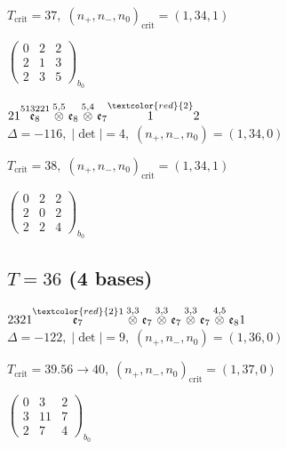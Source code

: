 \documentclass[10pt]{article}
\begin{document}
\hspace{1em}$T_{\text{crit}}=37,\; (n_+,n_-,n_0)_{\text{crit}}=(1,34,1)$

\hspace{2em}$\left(\begin{smallmatrix}0 & 2 & 2 \\ 2 & 1 & 3 \\ 2 & 3 & 5\end{smallmatrix}\right)_{\!b_0}$

\smallskip

$21\overset{513221}{\mathfrak{e}_8}\overset{5,5}{\otimes}\mathfrak{e}_8\overset{5,4}{\otimes}\mathfrak{e}_7\overset{\textcolor{red}{2}}{1}2$ \quad $\Delta=-116,\; |\det|=4,\; (n_+,n_-,n_0)=(1,34,0)$

\hspace{1em}$T_{\text{crit}}=38,\; (n_+,n_-,n_0)_{\text{crit}}=(1,34,1)$

\hspace{2em}$\left(\begin{smallmatrix}0 & 2 & 2 \\ 2 & 0 & 2 \\ 2 & 2 & 4\end{smallmatrix}\right)_{\!b_0}$


\subsection*{$T = 36$ \quad (4 bases)}
\smallskip

$2321\overset{\textcolor{red}{2}1}{\mathfrak{e}_7}\overset{3,3}{\otimes}\mathfrak{e}_7\overset{3,3}{\otimes}\mathfrak{e}_7\overset{3,3}{\otimes}\mathfrak{e}_7\overset{4,5}{\otimes}\mathfrak{e}_81$ \quad $\Delta=-122,\; |\det|=9,\; (n_+,n_-,n_0)=(1,36,0)$

\hspace{1em}$T_{\text{crit}}=39.56 \to 40,\; (n_+,n_-,n_0)_{\text{crit}}=(1,37,0)$

\hspace{2em}$\left(\begin{smallmatrix}0 & 3 & 2 \\ 3 & 11 & 7 \\ 2 & 7 & 4\end{smallmatrix}\right)_{\!b_0}$
\end{document}
